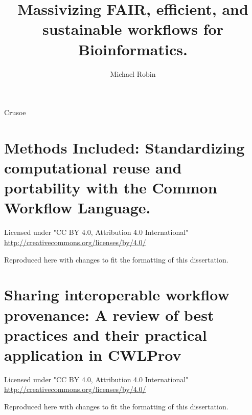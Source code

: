 \documentclass{dissertation}
\begin{document}
\title{Massivizing {FAIR,} {efficient,} and sustainable workflows for Bioinformatics.}
\author{Michael Robin}{Crusoe}

\frontmatter




\setcounter{tocdepth}{1}
\tableofcontents




\mainmatter

\thumbtrue




\chapter{Methods Included: Standardizing computational reuse and portability with the Common Workflow Language.}
\label{methods-included}


Licensed under "CC BY 4.0, Attribution 4.0 International" \url{http://creativecommons.org/licenses/by/4.0/}

Reproduced here with changes to fit the formatting of this dissertation.


%

\chapter{Sharing interoperable workflow provenance: A review of best practices and their practical application in CWLProv}
\label{cwlprov}

Licensed under "CC BY 4.0, Attribution 4.0 International" \url{http://creativecommons.org/licenses/by/4.0/}

Reproduced here with changes to fit the formatting of this dissertation.

\end{document}

